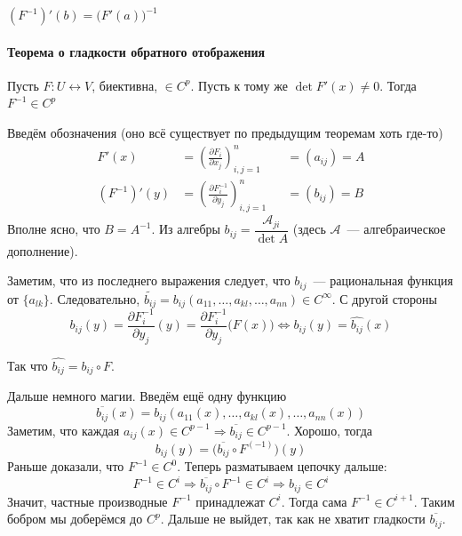 \documentclass[12pt,timbord]{../../../notes}
\begin{document}
\begin{cor*}
  $\displaystyle (F^{-1})'(b) = \bigl(F'(a)\bigr)^{-1}$
\end{cor*}

\paragraph{Теорема о гладкости обратного отображения}
\label{par:diffspace::invsmooth}

\begin{thrm}\label{thrm:diffspace::invsmooth}
  Пусть $F\colon U \leftrightarrow V$, биективна, $\in C^p$. Пусть к тому же $\det F'(x) \neq 0$.
  Тогда $F^{-1} \in C^p$
\end{thrm}
\begin{ittproof}
  Введём обозначения (оно всё существует по предыдущим теоремам хоть где-то)
  \[
    \begin{aligned}
      F'(x) &= \left(\frac{\partial F_i}{\partial x_j}\right)_{i,j=1}^n & &= (a_{ij}) = A \\
      (F^{-1})'(y) &= \left(\frac{\partial F^{-1}_i}{\partial y_j}\right)_{i,j=1}^n & &= (b_{ij}) = B 
    \end{aligned}
  \]
  Вполне ясно, что $B = A^{-1}$. Из алгебры $b_{ij} = \dfrac{\mathcal A_{ji}}{\det A}$ 
  (здесь $\mathcal A$~--- алгебраическое дополнение).
  
  Заметим, что из последнего выражения следует, что $b_{ij}$~--- рациональная функция от $\{a_{lk}\}$.
  Следовательно, $\widetilde{b_{ij}} = b_{ij}(a_{11}, \dotsc, a_{kl}, \dotsc, a_{nn}) \in C^\infty$.
  С другой стороны
  \[
    b_{ij}(y) = \frac{\partial F_i^{-1}}{\partial y_j}(y) = \frac{\partial F_i^{-1}}{\partial y_j}\bigl(F(x)\bigr)
    \Leftrightarrow b_{ij}(y) = \widehat{b_{ij}}(x)
  \]

  Так что $\widehat{b_{ij}} = b_{ij} \circ F$. 

  Дальше немного магии. Введём ещё одну функцию
  \[
    \overline{b_{ij}}(x) = b_{ij}(a_{11}(x), \dotsc, a_{kl}(x), \dotsc, a_{nn}(x))   
  \]
  Заметим, что каждая $a_{ij}(x) \in C^{p-1} \Rightarrow \overline{b_{ij}} \in C^{p-1}$.
  Хорошо, тогда 
  \[
    b_{ij}(y) = \bigl(\overline{b_{ij}} \circ F^{(-1)}\bigr)(y) 
  \]
  Раньше доказали, что $F^{-1} \in C^0$. Теперь разматываем цепочку дальше:
  \[
    F^{-1} \in C^i \Rightarrow \overline{b_{ij}} \circ F^{-1} \in C^i \Rightarrow b_{ij} \in C^i 
  \]
  Значит, частные производные $F^{-1}$ принадлежат $C^i$. Тогда сама $F^{-1} \in C^{i+1}$.
  Таким бобром мы доберёмся до $C^p$. 
  Дальше не выйдет, так как не хватит гладкости $\overline{b_{ij}}$.
\end{ittproof}
\end{document}
